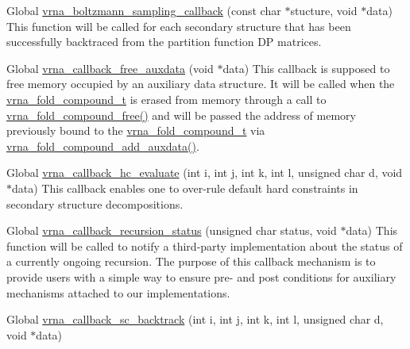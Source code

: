 \begin{DoxyRefList}
\item[Global \mbox{\hyperlink{group__subopt__stochbt_gad5bd9c8b195dd9cde15389f0042f0e44}{vrna\+\_\+boltzmann\+\_\+sampling\+\_\+callback}} (const char $\ast$stucture, void $\ast$data)]\label{callbacks__callbacks000001}%
%
 This function will be called for each secondary structure that has been successfully backtraced from the partition function DP matrices.  
\item[Global \mbox{\hyperlink{group__fold__compound_ga7806651f51b195013839a218b3bbd5a3}{vrna\+\_\+callback\+\_\+free\+\_\+auxdata}} (void $\ast$data)]\label{callbacks__callbacks000002}%
%
 This callback is supposed to free memory occupied by an auxiliary data structure. It will be called when the \mbox{\hyperlink{group__fold__compound_ga1b0cef17fd40466cef5968eaeeff6166}{vrna\+\_\+fold\+\_\+compound\+\_\+t}} is erased from memory through a call to \mbox{\hyperlink{group__fold__compound_ga576a077b418a9c3650e06f8e5d296fc2}{vrna\+\_\+fold\+\_\+compound\+\_\+free()}} and will be passed the address of memory previously bound to the \mbox{\hyperlink{group__fold__compound_ga1b0cef17fd40466cef5968eaeeff6166}{vrna\+\_\+fold\+\_\+compound\+\_\+t}} via \mbox{\hyperlink{group__fold__compound_gafc44c76a1aacf61bfccb8cd698772b98}{vrna\+\_\+fold\+\_\+compound\+\_\+add\+\_\+auxdata()}}.  
\item[Global \mbox{\hyperlink{group__hard__constraints_gae465f1d4a3d8b6592b38ecbb0d9f613d}{vrna\+\_\+callback\+\_\+hc\+\_\+evaluate}} (int i, int j, int k, int l, unsigned char d, void $\ast$data)]\label{callbacks__callbacks000013}%
%
 This callback enables one to over-\/rule default hard constraints in secondary structure decompositions.  
\item[Global \mbox{\hyperlink{group__fold__compound_gac86036fa8cad1108832335063243cdc8}{vrna\+\_\+callback\+\_\+recursion\+\_\+status}} (unsigned char status, void $\ast$data)]\label{callbacks__callbacks000003}%
%
 This function will be called to notify a third-\/party implementation about the status of a currently ongoing recursion. The purpose of this callback mechanism is to provide users with a simple way to ensure pre-\/ and post conditions for auxiliary mechanisms attached to our implementations.  
\item[Global \mbox{\hyperlink{group__soft__constraints_gaeb6448da6c593d4c489c7fbadcb99499}{vrna\+\_\+callback\+\_\+sc\+\_\+backtrack}} (int i, int j, int k, int l, unsigned char d, void $\ast$data)]\label{callbacks__callbacks000016}%

\end{DoxyRefList}
